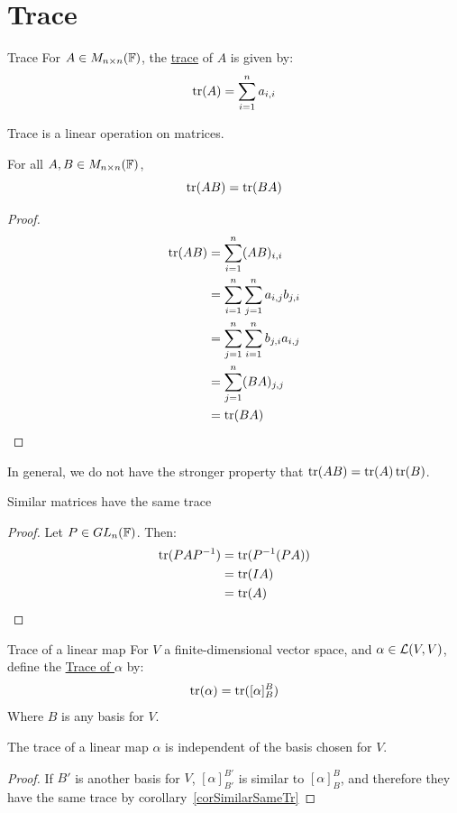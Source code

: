 \documentclass[../Main.tex]{subfiles}
\begin{document}
\section{Trace}
\begin{definition}{Trace}
    For $A \in M_{n \times n}(\mathbb{F})$, the \underline{trace} of $A$ is given by:
    \begin{equation*}
        \operatorname{tr}(A) = \sum_{i=1}^n a_{i, i}
    \end{equation*}
\end{definition}
\begin{remark}
    Trace is a linear operation on matrices.
\end{remark}
\begin{lemma}
    For all $A, B \in M_{n \times n}(\mathbb{F})$,
    \begin{equation*}
        \operatorname{tr}(AB) = \operatorname{tr}(BA)
    \end{equation*}
    \label{lemTrCommute}
\end{lemma}
\begin{proof}
    \begin{align*}
        \operatorname{tr}(AB) &= \sum_{i=1}^{n} (AB)_{i, i} \\
        &= \sum_{i=1}^{n} \sum_{j=1}^{n} a_{i, j} b_{j, i} \\
        &= \sum_{j=1}^{n} \sum_{i=1}^{n} b_{j, i} a_{i, j} \\
        &= \sum_{j=1}^{n} (BA)_{j, j} \\
        &= \operatorname{tr}(BA)
    \end{align*}
\end{proof}
\begin{remark}
    In general, we do not have the stronger property that $\operatorname{tr}(AB) = \operatorname{tr}(A) \operatorname{tr}(B)$.
\end{remark}
\begin{corollary}
    Similar matrices have the same trace
    \label{corSimilarSameTr}
\end{corollary}
\begin{proof}
    Let $P \in GL_{n}(\mathbb{F})$. Then:
    \begin{align*}
        \operatorname{tr}(PAP^{-1}) &= \operatorname{tr}(P^{-1} (PA)) \\
        &= \operatorname{tr}(IA) \\
        &= \operatorname{tr}(A)
    \end{align*}
\end{proof}
\begin{definition}{Trace of a linear map}
    For $V$ a finite-dimensional vector space, and $\alpha \in \mathcal{L}(V, V)$, define the \underline{Trace of $\alpha$} by:
    \begin{equation*}
        \operatorname{tr}(\alpha) = \operatorname{tr}([\alpha]_B^B)
    \end{equation*}
    Where $B$ is any basis for $V$.
\end{definition}
\begin{proposition}
    The trace of a linear map $\alpha$ is independent of the basis chosen for $V$.
    \label{propLMTraceWellDef}
\end{proposition}
\begin{proof}
    If $B'$ is another basis for $V$, $[\alpha]_{B'}^{B'}$ is similar to $[\alpha]_B^B$, and therefore they have the same trace by corollary~\ref{corSimilarSameTr}
\end{proof}
\end{document}

